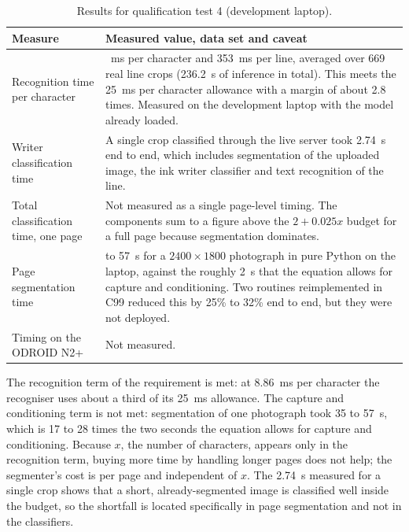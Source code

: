 \begin{table}[h]
\centering
\fontsize{10}{12}\selectfont
\begin{tabularx}{\linewidth}{|>{\raggedright\arraybackslash}p{4.9cm}|>{\raggedright\arraybackslash}X|}
\hline
\textbf{Measure} & \textbf{Measured value, data set and caveat} \\
\hline
Recognition time per character & 8.86~ms per character and 353~ms per line, averaged over 669 real line crops (236.2~s of inference in total). This meets the 25~ms per character allowance with a margin of about 2.8 times. Measured on the development laptop with the model already loaded. \\
\hline
Writer classification time & A single crop classified through the live server took 2.74~s end to end, which includes segmentation of the uploaded image, the ink writer classifier and text recognition of the line. \\
\hline
Total classification time, one page & Not measured as a single page-level timing. The components sum to a figure above the $2+0.025x$ budget for a full page because segmentation dominates. \\
\hline
Page segmentation time & 35 to 57~s for a $2400\times1800$ photograph in pure Python on the laptop, against the roughly 2~s that the equation allows for capture and conditioning. Two routines reimplemented in C99 reduced this by 25\% to 32\% end to end, but they were not deployed. \\
\hline
Timing on the ODROID N2+ & Not measured. \\
\hline
\end{tabularx}
\caption{Results for qualification test 4 (development laptop).}
\label{tab:res-r4}
\end{table}


            The recognition term of the requirement is met: at 8.86~ms per character the recogniser uses about a third of its 25~ms allowance.
            The capture and conditioning term is not met: segmentation of one photograph took 35 to 57~s, which is 17 to 28 times the two seconds the equation allows for capture and conditioning.
            Because $x$, the number of characters, appears only in the recognition term, buying more time by handling longer pages does not help; the segmenter's cost is per page and independent of $x$.
            The 2.74~s measured for a single crop shows that a short, already-segmented image is classified well inside the budget, so the shortfall is located specifically in page segmentation and not in the classifiers.

